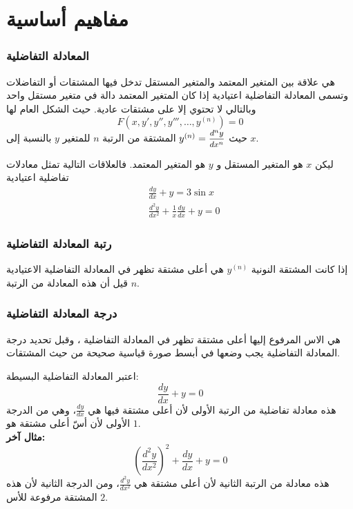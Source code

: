 \chapter{مفاهيم أساسية}
 
\subsection*{المعادلة التفاضلية \cite{diff_eqs_sols_apps}}
    هي علاقة بين المتغير المعتمد والمتغير المستقل تدخل فيها المشتقات أو التفاضلات وتسمى المعادلة التفاضلية اعتيادية إذا كان المتغير المعتمد دالة في متغير مستقل واحد وبالتالي لا تحتوي إلا على مشتقات عادية. حيث الشكل العام لها
\[
F(x,y',y'',y''',\dots,y^{(n)})=0
\]
حيث $y^{(n)}=\mfrac{d^ny}{dx^n}$ المشتقة من الرتبة $n$ للمتغير $y$ بالنسبة إلى $x$.

\begin{nexample}
    ليكن $x$ هو المتغير المستقل و $y$ هو المتغير المعتمد. فالعلاقات التالية تمثل معادلات تفاضلية اعتيادية
    \begin{align}
        &\frac{dy}{dx}+y=3\sin x\label{diff_eq_ex1}\\
        &\frac{d^2y}{dx^2}+\frac{1}{x}\frac{dy}{dx}+y=0\label{diff_eq_ex2}
    \end{align}
\end{nexample}

\subsection*{رتبة المعادلة التفاضلية \cite{diff_eqs_sols_apps}}
    إذا كانت المشتقة النونية $y^{(n)}$ هي أعلى مشتقة تظهر في المعادلة التفاضلية الاعتيادية قيل أن هذه المعادلة من الرتبة $n$.


\subsection*{درجة المعادلة التفاضلية \cite{diff_eqs_sols_apps}}
    هي الاس المرفوع إليها أعلى مشتقة تظهر في المعادلة التفاضلية ، وقبل تحديد درجة المعادلة التفاضلية يجب وضعها في أبسط صورة قياسية صحيحة من حيث المشتقات.
\newpage
\begin{nexample}
	اعتبر المعادلة التفاضلية البسيطة:
	\[
	\frac{dy}{dx} + y = 0
	\]
	هذه معادلة تفاضلية من الرتبة الأولى لأن أعلى مشتقة فيها هي $\frac{dy}{dx}$، 
	وهي من الدرجة الأولى لأن أسّ أعلى مشتقة هو $1$.\\
	\noindent
\textbf{	مثال آخر:}
	\[
	\left(\frac{d^2 y}{dx^2}\right)^2 + \frac{dy}{dx} + y = 0
	\]
	هذه معادلة من الرتبة الثانية لأن أعلى مشتقة هي $\frac{d^2 y}{dx^2}$،
	ومن الدرجة الثانية لأن هذه المشتقة مرفوعة للأس $2$.
\end{nexample}

